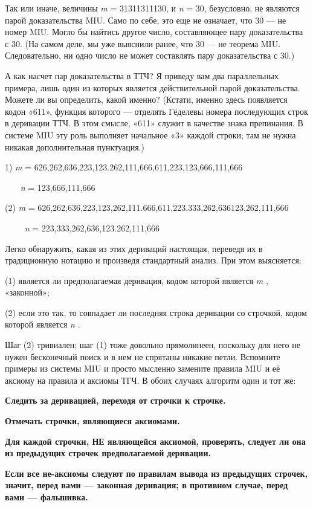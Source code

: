 \documentclass[../main.tex]{subfiles}
\begin{document}
Так или иначе, величины \emph{m} = 31311311130, и \emph{n} = 30, безусловно, не являются парой доказательства MIU\@. Само по себе, это еще не означает, что 30 --- не номер MIU\@. Могло бы найтись другое число, составляющее пару доказательства с 30. (На самом деле, мы уже выяснили ранее, что 30 --- не теорема MIU\@. Следовательно, ни одно число не может составлять пару доказательства с 30.)

А как насчет пар доказательства в ТТЧ? Я приведу вам два параллельных примера, лишь один из которых является действительной парой доказательства. Можете ли вы определить, какой именно? (Кстати, именно здесь появляется кодон «611», функция которого --- отделять Гёделевы номера последующих строк в деривации ТТЧ\@. В этом смысле, «611» служит в качестве знака препинания. В системе MIU эту роль выполняет начальное «3» каждой строки; там не нужна никакая дополнительная пунктуация.)

1) \emph{m} = 626,262,636,223,123.262,111,666,611,223,123,666,111,666

~~~ \emph{n} = 123,666,111,666

(2) \emph{m} = 626,262,636,223,123,262,111.666,611,223.333,262,636123,262,111,666

~~~~ \emph{n} = 223,333,262,636,123.262,111,666

Легко обнаружить, какая из этих дериваций настоящая, переведя их в традиционную нотацию и произведя стандартный анализ. При этом выясняется:

(1) является ли предполагаемая деривация, кодом которой является \emph{m} , «законной»;

(2) если это так, то совпадает ли последняя строка деривации со строчкой, кодом которой является \emph{n} .

Шаг (2) тривиален; шаг (1) тоже довольно прямолинеен, поскольку для него не нужен бесконечный поиск и в нем не спрятаны никакие петли. Вспомните примеры из системы MIU и просто мысленно замените правила MIU и её аксиому на правила и аксиомы ТГЧ\@. В обоих случаях алгоритм один и тот же:

\textbf{Следить за деривацией, переходя от строчки к строчке.}

\textbf{Отмечать строчки, являющиеся аксиомами.}

\textbf{Для каждой строчки, НЕ являющейся аксиомой, проверять, следует ли она из предыдущих строчек предполагаемой деривации.}

\textbf{Если все не-аксиомы следуют по правилам вывода из предыдущих строчек, значит, перед вами --- законная деривация; в противном случае, перед вами --- фальшивка.}
\end{document}
